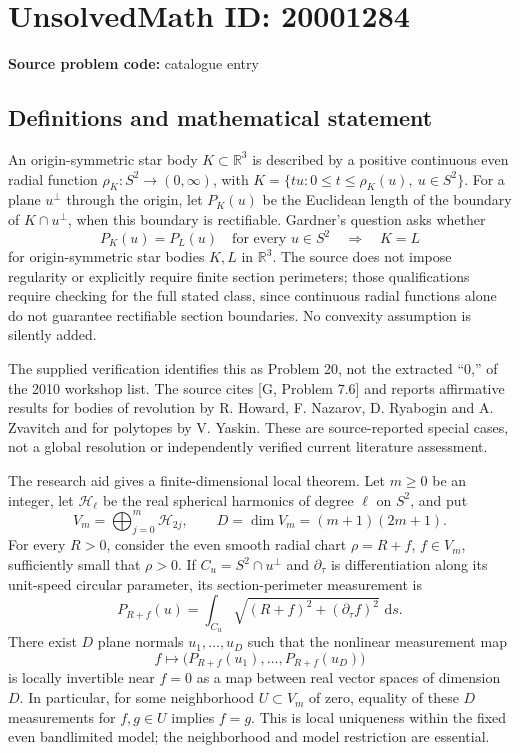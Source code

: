 \documentclass[11pt]{article}
\newcommand{\R}{\mathbb{R}}
\newcommand{\dd}{\,\mathrm{d}}
\begin{document}
\section*{UnsolvedMath ID: 20001284}
\textbf{Source problem code:} catalogue entry
\subsection{Definitions and mathematical statement}
An origin-symmetric star body \(K\subset\R^3\) is described by a positive continuous even radial function \(\rho_K:S^2\to(0,\infty)\), with \(K=\{tu:0\le t\le\rho_K(u),\ u\in S^2\}\). For a plane \(u^\perp\) through the origin, let \(P_K(u)\) be the Euclidean length of the boundary of \(K\cap u^\perp\), when this boundary is rectifiable. Gardner's question asks whether
\[
P_K(u)=P_L(u)\quad\text{for every }u\in S^2
\quad\Longrightarrow\quad K=L
\]
for origin-symmetric star bodies \(K,L\) in \(\R^3\). The source does not impose regularity or explicitly require finite section perimeters; those qualifications require checking for the full stated class, since continuous radial functions alone do not guarantee rectifiable section boundaries. No convexity assumption is silently added.

The supplied verification identifies this as Problem 20, not the extracted ``0,'' of the 2010 workshop list. The source cites [G, Problem 7.6] and reports affirmative results for bodies of revolution by R. Howard, F. Nazarov, D. Ryabogin and A. Zvavitch and for polytopes by V. Yaskin. These are source-reported special cases, not a global resolution or independently verified current literature assessment.

The research aid gives a finite-dimensional local theorem. Let \(m\ge0\) be an integer, let \(\mathcal H_\ell\) be the real spherical harmonics of degree \(\ell\) on \(S^2\), and put
\[
V_m=\bigoplus_{j=0}^m\mathcal H_{2j},\qquad D=\dim V_m=(m+1)(2m+1).
\]
For every \(R>0\), consider the even smooth radial chart \(\rho=R+f\), \(f\in V_m\), sufficiently small that \(\rho>0\). If \(C_u=S^2\cap u^\perp\) and \(\partial_\tau\) is differentiation along its unit-speed circular parameter, its section-perimeter measurement is
\[
P_{R+f}(u)=\int_{C_u}\sqrt{(R+f)^2+(\partial_\tau f)^2}\,\dd s.
\]
There exist \(D\) plane normals \(u_1,\ldots,u_D\) such that the nonlinear measurement map
\[
f\longmapsto\bigl(P_{R+f}(u_1),\ldots,P_{R+f}(u_D)\bigr)
\]
is locally invertible near \(f=0\) as a map between real vector spaces of dimension \(D\). In particular, for some neighborhood \(U\subset V_m\) of zero, equality of these \(D\) measurements for \(f,g\in U\) implies \(f=g\). This is local uniqueness within the fixed even bandlimited model; the neighborhood and model restriction are essential.
\end{document}
